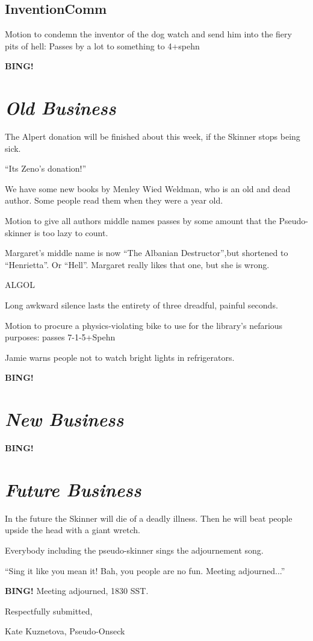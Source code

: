 \documentclass[10pt]{article}
\newcommand{\bing}{{\bf BING!} }
\newcommand{\goto}[1]{\bing \vskip 12pt \section*{{\em{#1}}}}
\begin{document}
\subsection*{InventionComm}

Motion to condemn the inventor of the dog watch and send him into the fiery pits of hell: Passes by a lot to something to 4+spehn


\goto{Old Business}

The Alpert donation will be finished about this week, if the Skinner stops being sick. 

``Its Zeno's donation!''

We have some new books by Menley Wied Weldman, who is an old and dead author.  Some people read them when they were a year old.

Motion to give all authors middle names passes by some amount that the Pseudo-skinner is too lazy to count.

Margaret's middle name is now ``The Albanian Destructor'',but shortened to ``Henrietta''. Or ``Hell''. Margaret really likes that one, but she is wrong. 

ALGOL 

Long awkward silence lasts the entirety of three dreadful, painful seconds.

Motion to procure a physics-violating bike to use for the library's nefarious purposes: passes 7-1-5+Spehn

Jamie warns people not to watch bright lights in refrigerators.

\goto{New Business}

\goto{Future Business}

In the future the Skinner will die of a deadly illness. Then he will beat people upside the head with a giant wretch. 

Everybody including the pseudo-skinner sings the adjournement song.

``Sing it like you mean it! Bah, you people are no fun. Meeting adjourned...''

\bing
\noindent
Meeting adjourned, 1830 SST.

\vspace{18pt}

\centerline{Respectfully submitted,}
\centerline{Kate Kuznetova, Pseudo-Onseck}
\end{document}
